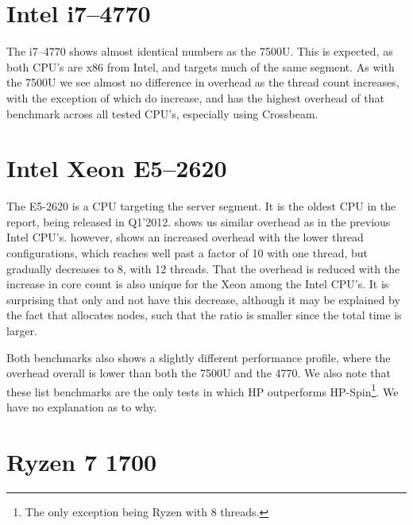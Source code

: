 \documentclass[b5paper]{report}
\begin{document}

\clearpage
\section{Intel\textregistered{} i7--4770}

The i7--4770 shows almost identical numbers as the 7500U. This is expected, as
both CPU's are x86 from Intel, and targets much of the same segment. As with the
7500U we see almost no difference in overhead as the thread count increases,
with the exception of  which do increase, and has the highest
overhead of that benchmark across all tested CPU's, especially using
Crossbeam.


\clearpage
\section{Intel\textregistered{} Xeon\textregistered{} E5--2620}

The E5-2620 is a CPU targeting the server segment. It is the oldest CPU in the
report, being released in Q1'2012.  shows us similar overhead as in
the previous Intel CPU's.  however, shows an increased overhead
with the lower thread configurations, which reaches well past a factor of 10 with
one thread, but gradually decreases to 8, with 12 threads. That the overhead is
reduced with the increase in core count is also unique for the Xeon among the
Intel CPU's. It is surprising that only  and not  have
this decrease, although it may be explained by the fact that 
allocates nodes, such that the ratio is smaller since the total time is larger.

Both  benchmarks also shows a slightly different performance profile,
where the overhead overall is lower than both the 7500U and the 4770.
We also note that these list benchmarks are the only tests in which HP
outperforms HP-Spin\footnote{The only exception being Ryzen 
with 8 threads.}. We have no explanation as to why.


\clearpage
\section{Ryzen 7 1700}
\end{document}
